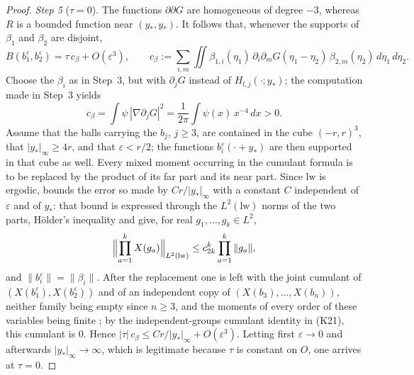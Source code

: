 \documentclass[11pt]{amsart}
\theoremstyle{definition}
\begin{document}
\begin{proof}
\emph{Step 5} ($\tau=0$).
The functions $\partial\partial G$ are homogeneous of degree $-3$, whereas $R$ is a bounded function near $(y_*,y_*)$.
It follows that, whenever the supports of $\beta_1$ and $\beta_2$ are disjoint,
\begin{equation*}
B(b_1^\varepsilon,b_2^\varepsilon)=\tau\,c_\beta+O(\varepsilon^3),\qquad c_\beta:=\sum_{i,m}\iint\beta_{1,i}(\eta_1)\,\partial_i\partial_mG(\eta_1-\eta_2)\,\beta_{2,m}(\eta_2)\,d\eta_1\,d\eta_2.
\end{equation*}
Choose the $\beta_i$ as in Step~3, but with $\partial_jG$ instead of $H_{l,j}(\cdot;y_*)$; the computation made in Step~3 yields
\begin{equation*}
c_\beta=\int\psi\,|\nabla\partial_jG|^2=\frac1{2\pi}\int\psi(x)\,x^{-4}\,dx>0.
\end{equation*}
Assume that the balls carrying the $b_j$, $j\ge3$, are contained in the cube $(-r,r)^3$, that $|y_*|_\infty\ge4r$, and that $\varepsilon<r/2$; the functions $b_i^\varepsilon(\cdot+y_*)$ are then supported in that cube as well.
Every mixed moment occurring in the cumulant formula is to be replaced by the product of its far part and its near part.
Since $\mathrm{lw}$ is ergodic, \cite[Theorem~12.39; Theorem~1.4, Part~II\,(E4)]{QEDII} bounds the error so made by $Cr/|y_*|_\infty$ with a constant $C$ independent of $\varepsilon$ and of $y_*$:
that bound is expressed through the $L^2(\mathrm{lw})$ norms of the two parts, H\"older's inequality and \cite[Lemma~14.3\,(a)]{QEDII} give, for real $g_1,\dots,g_k\in L^2$,
\begin{equation*}
\Bigl\|\prod_{a=1}^kX(g_a)\Bigr\|_{L^2(\mathrm{lw})}\le c_{2k}^k\prod_{a=1}^k\|g_a\|,
\end{equation*}
and $\|b_i^\varepsilon\|=\|\beta_i\|$.
After the replacement one is left with the joint cumulant of $(X(b_1^\varepsilon),X(b_2^\varepsilon))$ and of an independent copy of $(X(b_3),\dots,X(b_n))$, neither family being empty since $n\ge3$, and the moments of every order of these variables being finite \cite[Lemma~14.3\,(a)]{QEDII};
by the independent-groups cumulant identity in (K21), this cumulant is $0$.
Hence $|\tau|\,c_\beta\le Cr/|y_*|_\infty+O(\varepsilon^3)$.
Letting first $\varepsilon\to0$ and afterwards $|y_*|_\infty\to\infty$, which is legitimate because $\tau$ is constant on $O$, one arrives at $\tau=0$.


\end{proof}
\end{document}
